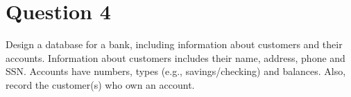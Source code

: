 
\section*{Question 4}

Design a database for a bank, including information about customers and their accounts. Information about customers includes their name, address, phone and SSN. Accounts have numbers, types (e.g., savings/checking) and balances. Also, record the customer(s) who own an account.


